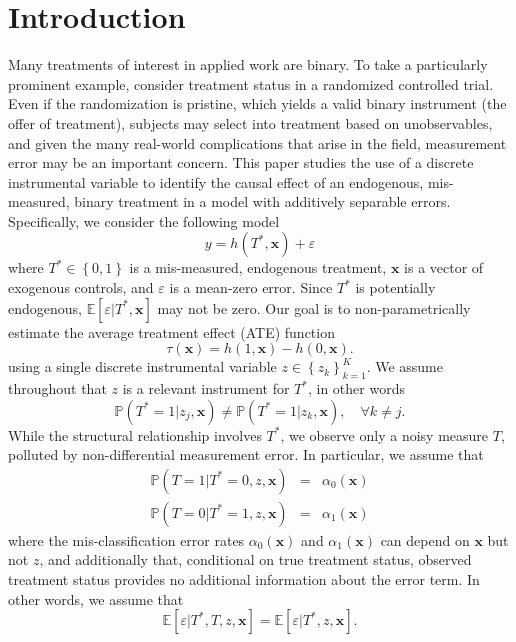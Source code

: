 \section{Introduction}
Many treatments of interest in applied work are binary.
To take a particularly prominent example, consider treatment status in a randomized controlled trial.
Even if the randomization is pristine, which yields a valid binary instrument (the offer of treatment), subjects may select into treatment based on unobservables, and given the many real-world complications that arise in the field, measurement error may be an important concern.
This paper studies the use of a discrete instrumental variable to identify the causal effect of an endogenous, mis-measured, binary treatment in a model with additively separable errors.
Specifically, we consider the following model 
\begin{equation}
  y = h(T^*, \mathbf{x}) + \varepsilon
  \label{eq:model}
\end{equation}
where $T^*\in \left\{ 0,1 \right\}$ is a mis-measured, endogenous treatment, $\mathbf{x}$ is a vector of exogenous controls, and $\varepsilon$ is a mean-zero error.
Since $T^*$ is potentially endogenous, $\mathbb{E}[\varepsilon|T^*,\mathbf{x}]$ may not be zero.
Our goal is to non-parametrically estimate the average treatment effect (ATE) function
\begin{equation}
  \tau(\mathbf{x}) = h(1,\mathbf{x}) - h(0,\mathbf{x}).
  \label{eq:ATE}
\end{equation}
using a single discrete instrumental variable $z \in \left\{ z_k \right\}_{k=1}^K$.
We assume throughout that $z$ is a relevant instrument for $T^*$, in other words 
\begin{equation}
\mathbb{P}(T^*=1|z_j,\mathbf{x})\neq \mathbb{P}(T^*=1|z_k,\mathbf{x}), \quad \forall k\neq j.
\end{equation}
While the structural relationship involves $T^*$, we observe only a noisy measure $T$, polluted by non-differential measurement error.
In particular, we assume that
\begin{eqnarray}
  \label{eq:a0}
  \mathbb{P}(T = 1| T^* = 0, z, \mathbf{x})  &=&  \alpha_0(\mathbf{x})\\
  \label{eq:a1}
  \mathbb{P}(T = 0| T^* = 1, z, \mathbf{x})  &=&  \alpha_1(\mathbf{x})
\end{eqnarray}
where the mis-classification error rates $\alpha_0(\mathbf{x})$ and $\alpha_1(\mathbf{x})$ can depend on $\mathbf{x}$ but not $z$, and additionally that, conditional on true treatment status, observed treatment status provides no additional information about the error term.
In other words, we assume that
\begin{equation}
  \mathbb{E}[\varepsilon|T^*,T,z,\mathbf{x}] =  \mathbb{E}[\varepsilon|T^*,z,\mathbf{x}].
  \label{eq:nondiff}
\end{equation}


